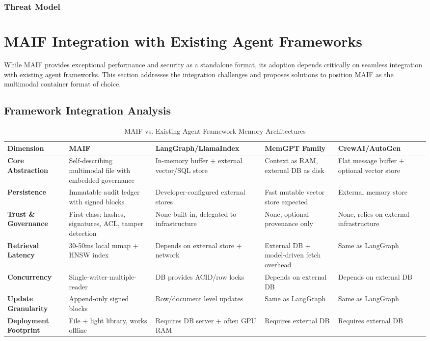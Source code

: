 \documentclass[conference]{IEEEtran}
\begin{document}
\subsubsection{Threat Model}
\section{MAIF Integration with Existing Agent Frameworks}
\label{sec:integration}

While MAIF provides exceptional performance and security as a standalone format, its adoption depends critically on seamless integration with existing agent frameworks. This section addresses the integration challenges and proposes solutions to position MAIF as the multimodal container format of choice.

\subsection{Framework Integration Analysis}

\begin{table*}[!t]
\renewcommand{\arraystretch}{1.3}
\caption{MAIF vs. Existing Agent Framework Memory Architectures}
\label{tab:framework-comparison}
\centering
\tiny
\begin{tabular}{p{2.5cm}p{3cm}p{3cm}p{3cm}p{3cm}}
\toprule
\textbf{Dimension} & \textbf{MAIF} & \textbf{LangGraph/LlamaIndex} & \textbf{MemGPT Family} & \textbf{CrewAI/AutoGen} \\
\midrule
\textbf{Core Abstraction} & Self-describing multimodal file with embedded governance & In-memory buffer + external vector/SQL store & Context as RAM, external DB as disk & Flat message buffer + optional vector store \\
\textbf{Persistence} & Immutable audit ledger with signed blocks & Developer-configured external stores & Fast mutable vector store expected & External memory store \\
\textbf{Trust \& Governance} & First-class: hashes, signatures, ACL, tamper detection & None built-in, delegated to infrastructure & None, optional provenance only & None, relies on external infrastructure \\
\textbf{Retrieval Latency} & 30-50ms local mmap + HNSW index & Depends on external store + network & External DB + model-driven fetch overhead & Same as LangGraph \\
\textbf{Concurrency} & Single-writer-multiple-reader & DB provides ACID/row locks & Depends on external DB & Depends on external DB \\
\textbf{Update Granularity} & Append-only signed blocks & Row/document level updates & Same as LangGraph & Same as LangGraph \\
\textbf{Deployment Footprint} & File + light library, works offline & Requires DB server + often GPU RAM & Requires external DB & Requires external DB \\
\bottomrule
\end{tabular}
\end{table*}
\end{document}
